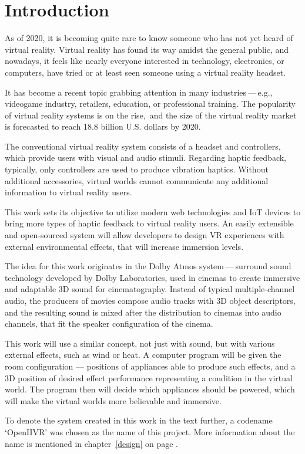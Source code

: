 \chapter{Introduction}\label{intro}

\vspace{8em}

As of 2020, it is becoming quite rare to know someone who has not yet heard
of virtual reality. Virtual reality has found its way amidst the general public,
and nowadays, it feels like nearly everyone interested in technology,
electronics, or computers, have tried or at least seen someone using a virtual
reality headset.

It has become a recent topic grabbing attention in many industries — e.g.,
videogame industry, retailers, education, or professional training. The popularity
of virtual reality systems is on the rise,\,\cite{shipments} and the size
of the virtual reality market is forecasted to reach 18.8 billion U.S. dollars
by 2020.\,\cite{vrmsize}

The conventional virtual reality system consists of a headset and controllers,
which provide users with visual and audio stimuli. Regarding haptic feedback,
typically, only controllers are used to produce vibration haptics. Without
additional accessories, virtual worlds cannot communicate any additional
information to virtual reality users.

This work sets its objective to utilize modern web technologies and IoT
devices to bring more types of haptic feedback to virtual reality users.
An easily extensible and open-sourced system will allow developers to design
VR experiences with external environmental effects, that will increase
immersion levels.

The idea for this work originates in the Dolby Atmos system — surround sound
technology developed by Dolby Laboratories, used in cinemas to create
immersive and adaptable 3D sound for cinematography. Instead of typical
multiple-channel audio, the producers of movies compose audio tracks with
3D object descriptors, and the resulting sound is mixed after the distribution
to cinemas into audio channels, that fit the speaker configuration
of the cinema.\,\cite{dawp}

This work will use a similar concept, not just with sound, but with various
external effects, such as wind or heat. A computer program will be given
the room configuration — positions of appliances able to produce such effects,
and a 3D position of desired effect performance representing a condition
in the virtual world. The program then will decide which appliances should
be powered, which will make the virtual worlds more believable and immersive.

To denote the system created in this work in the text further, a codename
`OpenHVR' was chosen as the name of this project. More information about
the name is mentioned in chapter~\ref{design} on page \pageref{design}.

